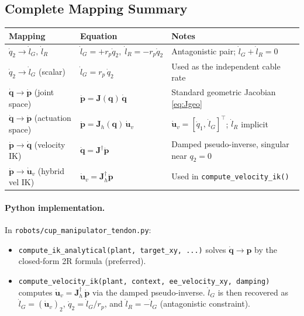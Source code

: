 \documentclass[12pt, a4paper]{article}
\theoremstyle{definition}
\newcommand{\bq}{\bm{q}}
\newcommand{\bp}{\bm{p}}
\newcommand{\bu}{\bm{u}}
\newcommand{\bJ}{\bm{J}}
\begin{document}
\subsection{Complete Mapping Summary}
\label{sec:mapping_summary}

\begin{center}
\renewcommand{\arraystretch}{1.6}
\begin{tabular}{p{5.1cm}ll}
  \toprule
  Mapping & Equation & Notes \\
  \midrule
  $\dot{q}_2 \to \dot{l}_G,\,\dot{l}_R$
    & $\dot{l}_G = +r_p\dot{q}_2,\;\dot{l}_R = -r_p\dot{q}_2$
    & Antagonistic pair; $\dot{l}_G + \dot{l}_R = 0$ \\
  $\dot{q}_2 \to \dot{l}_G$ (scalar)
    & $\dot{l}_G = r_p\,\dot{q}_2$
    & Used as the independent cable rate \\
  $\dot{\bq} \to \dot{\bp}$ (joint space)
    & $\dot{\bp} = \bJ(\bq)\,\dot{\bq}$
    & Standard geometric Jacobian \cref{eq:Jgeo} \\
  $\dot{\bq} \to \dot{\bp}$ (actuation space)
    & $\dot{\bp} = \bJ_h(\bq)\,\dot{\bu}_v$
    & $\dot{\bu}_v = [\dot{q}_1,\,\dot{l}_G]^\top$; $\dot{l}_R$ implicit \\
  $\dot{\bp} \to \dot{\bq}$ (velocity IK)
    & $\dot{\bq} = \bJ^{\dag}\dot{\bp}$
    & Damped pseudo-inverse, singular near $q_2=0$ \\
  $\dot{\bp} \to \dot{\bu}_v$ (hybrid vel IK)
    & $\dot{\bu}_v = \bJ_h^{\dag}\dot{\bp}$
    & Used in \texttt{compute\_velocity\_ik()} \\
  \bottomrule
\end{tabular}
\end{center}

\paragraph{Python implementation.}
In \texttt{robots/cup\_manipulator\_tendon.py}:
\begin{itemize}[leftmargin=2em]
  \item \texttt{compute\_ik\_analytical(plant, target\_xy, ...)} solves
        $\dot{\bq} \to \bp$ by the closed-form 2R formula (preferred).
  \item \texttt{compute\_velocity\_ik(plant, context, ee\_velocity\_xy, damping)}
        computes $\dot{\bu}_v = \bJ_h^\dag\,\dot{\bp}$ via the damped pseudo-inverse.
        $\dot{l}_G$ is then recovered as $\dot{l}_G = (\dot{\bu}_v)_2$,
        $\dot{q}_2 = \dot{l}_G/r_p$, and
        $\dot{l}_R = -\dot{l}_G$ (antagonistic constraint).
\end{itemize}
\end{document}
